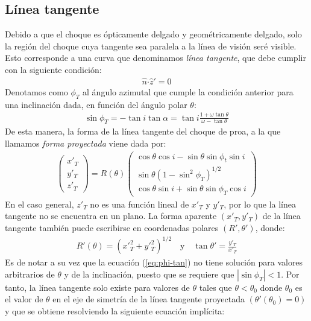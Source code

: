 \subsection{Línea tangente}
\label{sec:tangent-line}
Debido a que el choque es ópticamente delgado y geométricamente delgado, solo la región del choque cuya tangente sea paralela a la
línea de visión seré visible. Esto corresponde a una curva que denominamos \textit{línea tangente}, que debe cumplir con la siguiente
condición:
\begin{align}
  \hat{n}\boldsymbol{\cdot} \hat{z}' = 0
\end{align}
Denotamos como $\phi_T$ al ángulo azimutal que cumple la condición anterior para una inclinación dada, en función del ángulo polar $\theta$:
\begin{align}
  \sin\phi_T = -\tan i\tan\alpha = \tan i\frac{1+\omega\tan\theta}{\omega-\tan\theta}
  \label{eq:phi-tan}
\end{align}
De esta manera, la forma de la línea tangente del choque de proa, a la que llamamos \textit{forma proyectada} viene dada por:
\begin{align}
  \left(
  \begin{array}{c}
    x'_T \\
    y'_T \\
    z'_T
  \end{array}
  \right) =
  R(\theta)\left(
  \begin{array}{c}
    \cos\theta\cos i - \sin\theta\sin\phi_t\sin i \\
    \sin\theta\left(1-\sin^2\phi_T\right)^{1/2} \\
    \cos\theta\sin i + \sin\theta\sin\phi_T\cos i
  \end{array}
  \right) \label{eq:proj-shape}
\end{align}
En el caso general, $z'_T$ no es una función lineal de $x'_T$ y $y'_T$, por lo que la línea tangente no se encuentra en un plano. La forma aparente $(x'_T, y'_T)$  de la línea tangente también puede escribirse en coordenadas polares $(R', \theta')$, donde:
\begin{align}
  R'(\theta) = \left(x'^2_T + y'^2_T\right)^{1/2} \quad \mathrm{y} \quad \tan\theta' = \frac{y'_T}{x'_T}
  \label{eq:polar}
\end{align}
Es de notar a su vez que la ecuación (\ref{eq:phi-tan}) no tiene solución para valores arbitrarios de $\theta$ y de la inclinación, puesto que se requiere que $\left|\sin\phi_T\right| < 1$. Por tanto, la línea tangente solo existe para valores de $\theta$ tales que $\theta < \theta_0$ donde $\theta_0$ es el valor de $\theta$ en el eje de simetría de la línea tangente proyectada $(\theta'(\theta_0) = 0)$ y que se obtiene resolviendo la siguiente ecuación implícita:

